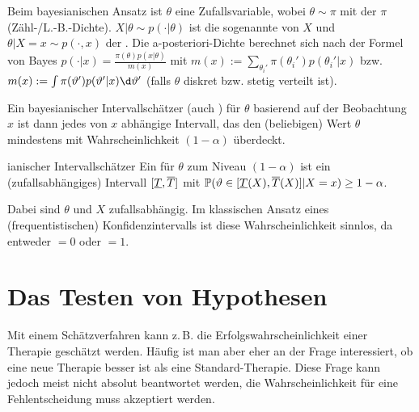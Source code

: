 \linie

\begin{Bem}
    Beim bayesianischen Ansatz ist $\theta$ eine Zufallsvariable,
    wobei $\theta \sim \pi$ mit der  $\pi$ (Zähl-/L.-B.-Dichte).
    $X|\theta \sim p(\cdot|\theta)$ ist die sogenannte  von $X$ und
    $\theta|X=x \sim p(\cdot,x)$ der .
    Die a-posteriori-Dichte berechnet sich nach der Formel von Bayes
    $p(\cdot|x) = \frac{\pi(\theta) p(x|\theta)}{m(x)}$ mit
    $m(x) := \sum_{\theta_i'} \pi(\theta_i') p(\theta_i'|x)$ bzw.
    $m(x) := \int \pi(\theta') p(\theta'|x) \d\theta'$
    (falls $\theta$ diskret bzw. stetig verteilt ist).

    Ein bayesianischer Intervallschätzer (auch ) für $\theta$
    basierend auf der Beobachtung $x$ ist dann jedes von $x$ abhängige Intervall, das den
    (beliebigen) Wert $\theta$ mindestens mit Wahrscheinlichkeit $(1 - \alpha)$ überdeckt.
\end{Bem}

\begin{Def}{ianischer Intervallschätzer}
    Ein  für $\theta$ zum Niveau $(1 - \alpha)$
    ist ein (zufallsabhängiges) Intervall $[\underline{T}, \overline{T}]$ mit
    $\mathbb{P}(\vartheta \in [\underline{T}(X), \overline{T}(X)]|X=x) \ge 1 - \alpha$.
\end{Def}

\begin{Bem}
    Dabei sind $\theta$ und $X$ zufallsabhängig.
    Im klassischen Ansatz eines (frequentistischen) Konfidenzintervalls ist diese
    Wahrscheinlichkeit sinnlos, da entweder $= 0$ oder $= 1$.
\end{Bem}

\pagebreak

\section{%
    Das Testen von Hypothesen%
}

\begin{Bem}
    Mit einem Schätzverfahren kann z.\,B. die Erfolgswahrscheinlichkeit
    einer Therapie geschätzt werden.
    Häufig ist man aber eher an der Frage interessiert, ob eine neue Therapie besser ist als
    eine Standard-Therapie.
    Diese Frage kann jedoch meist nicht absolut beantwortet werden, die Wahrscheinlichkeit für eine
    Fehlentscheidung muss akzeptiert werden.
\end{Bem}

